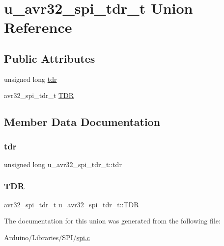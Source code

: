 \hypertarget{unionu__avr32__spi__tdr__t}{}\section{u\+\_\+avr32\+\_\+spi\+\_\+tdr\+\_\+t Union Reference}
\label{unionu__avr32__spi__tdr__t}
\subsection*{Public Attributes}
\begin{DoxyCompactItemize}
\item 
unsigned long \hyperlink{unionu__avr32__spi__tdr__t_a778b01c8c5c2e0fb1ad5b062b15c270c}{tdr}
\item 
avr32\+\_\+spi\+\_\+tdr\+\_\+t \hyperlink{unionu__avr32__spi__tdr__t_a425da47da39981295bab04c5b8b0d344}{T\+DR}
\end{DoxyCompactItemize}


\subsection{Member Data Documentation}
\mbox{\label{unionu__avr32__spi__tdr__t_a778b01c8c5c2e0fb1ad5b062b15c270c}} 
\subsubsection{\texorpdfstring{tdr}{tdr}}
{\footnotesize\ttfamily unsigned long u\+\_\+avr32\+\_\+spi\+\_\+tdr\+\_\+t\+::tdr}

\mbox{\label{unionu__avr32__spi__tdr__t_a425da47da39981295bab04c5b8b0d344}} 
\subsubsection{\texorpdfstring{T\+DR}{TDR}}
{\footnotesize\ttfamily avr32\+\_\+spi\+\_\+tdr\+\_\+t u\+\_\+avr32\+\_\+spi\+\_\+tdr\+\_\+t\+::\+T\+DR}



The documentation for this union was generated from the following file\+:\begin{DoxyCompactItemize}
\item 
Arduino/\+Libraries/\+S\+P\+I/\hyperlink{spi_8c}{spi.\+c}\end{DoxyCompactItemize}
